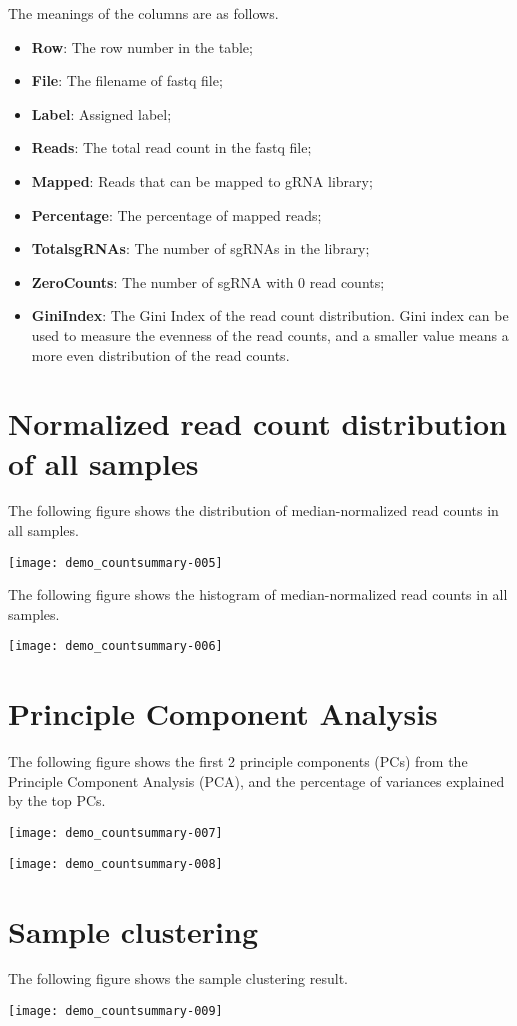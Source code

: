 \documentclass{article}
\begin{document}
The meanings of the columns are as follows.

\begin{itemize}
\item \textbf{Row}: The row number in the table;
\item \textbf{File}: The filename of fastq file;
\item \textbf{Label}: Assigned label;
\item \textbf{Reads}: The total read count in the fastq file;
\item \textbf{Mapped}: Reads that can be mapped to gRNA library;
\item \textbf{Percentage}: The percentage of mapped reads;
\item \textbf{TotalsgRNAs}: The number of sgRNAs in the library; 
\item \textbf{ZeroCounts}: The number of sgRNA with 0 read counts;
\item \textbf{GiniIndex}: The Gini Index of the read count distribution. Gini index can be used to measure the evenness of the read counts, and a smaller value means a more even distribution of the read counts.
\end{itemize}



\newpage\section{Normalized read count distribution of all samples}
The following figure shows the distribution of median-normalized read counts in all samples.


\texttt{[image: demo\_countsummary-005]}

The following figure shows the histogram of median-normalized read counts in all samples.


\texttt{[image: demo\_countsummary-006]}


\newpage\section{Principle Component Analysis}
The following figure shows the first 2 principle components (PCs) from the Principle Component Analysis (PCA), and the percentage of variances explained by the top PCs.



\texttt{[image: demo\_countsummary-007]}

\texttt{[image: demo\_countsummary-008]}


\newpage\section{Sample clustering}
The following figure shows the sample clustering result.


\texttt{[image: demo\_countsummary-009]}

\end{document}
